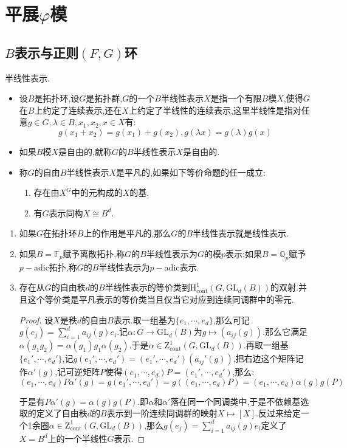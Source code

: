 \section{平展$\varphi$模}
\subsection{$B$表示与正则$(F,G)$环}

半线性表示.
\begin{itemize}
	\item 设$B$是拓扑环,设$G$是拓扑群,$G$的一个$B$半线性表示$X$是指一个有限$B$模$X$,使得$G$在$B$上约定了连续表示,还在$X$上约定了半线性的连续表示,这里半线性是指对任意$g\in G,\lambda\in B,x_1,x_2,x\in X$有:
	$$g(x_1+x_2)=g(x_1)+g(x_2),g(\lambda x)=g(\lambda)g(x)$$
	\item 如果$B$模$X$是自由的,就称$G$的$B$半线性表示$X$是自由的.
	\item 称$G$的自由$B$半线性表示$X$是平凡的,如果如下等价命题的任一成立:
	\begin{enumerate}
		\item 存在由$X^G$中的元构成的$X$的基.
		\item 有$G$表示同构$X\cong B^d$.
	\end{enumerate}
\end{itemize}
\begin{enumerate}
	\item 如果$G$在拓扑环$B$上的作用是平凡的,那么$G$的$B$半线性表示就是线性表示.
	\item 如果$B=\mathbb{F}_p$赋予离散拓扑,称$G$的$B$半线性表示为$G$的模$p$表示;如果$B=\mathbb{Q}_p$赋予$p-$adic拓扑,称$G$的$B$半线性表示为$p-$adic表示.
	\item 存在从$G$的自由秩$d$的$B$半线性表示的等价类到$\mathrm{H}_{\mathrm{cont}}^1(G,\mathrm{GL}_d(B))$的双射.并且这个等价类是平凡表示的等价类当且仅当它对应到连续同调群中的零元.
	\begin{proof}
		
		设$X$是秩$d$的自由$B$表示.取一组基为$\{e_1,\cdots,e_d\}$,那么可记$g(e_j)=\sum_{i=1}^da_{ij}(g)e_i$.记$\alpha:G\to\mathrm{GL}_d(B)$为$g\mapsto\left(a_{ij}(g)\right)$.那么它满足$\alpha(g_1g_2)=\alpha(g_1)g_1\alpha(g_2)$.于是$\alpha\in\mathrm{Z}_{\mathrm{cont}}^1(G,\mathrm{GL}_d(B))$.再取一组基$\{e_1',\cdots,e_d'\}$,记$g(e_1',\cdots,e_d')=(e_1',\cdots,e_d')\left(a_{ij}'(g)\right)$,把右边这个矩阵记作$\alpha'(g)$,记可逆矩阵$P$使得$(e_1,\cdots,e_d)P=(e_1',\cdots,e_d')$,那么:
		$$(e_1,\cdots,e_d)P\alpha'(g)=g(e_1',\cdots,e_d')=g((e_1,\cdots,e_d)P)=(e_1,\cdots,e_d)\alpha(g)g(P)$$
		
		于是有$P\alpha'(g)=\alpha(g)g(P)$.即$\alpha$和$\alpha'$落在同一个同调类中,于是不依赖基选取的定义了自由秩$d$的$B$表示到一阶连续同调群的映射$X\mapsto[X]$.反过来给定一个1余圈$\alpha\in\mathrm{Z}_{\mathrm{cont}}^1(G,\mathrm{GL}_d(B))$,那么$g(e_j)=\sum_{i=1}^da_{ij}(g)e_i$定义了$X=B^d$上的一个半线性$G$表示.
	\end{proof}
\end{enumerate}

